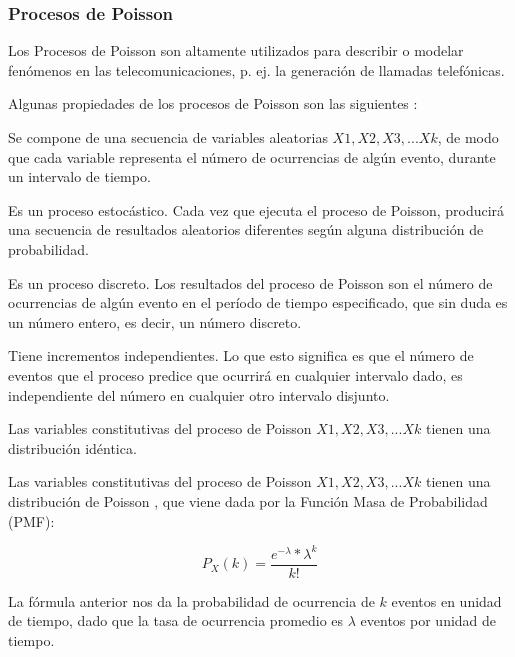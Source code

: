 \subsubsection{Procesos de Poisson}

Los Procesos de Poisson son altamente utilizados para describir o modelar fenómenos en las telecomunicaciones, p. ej. la generación de llamadas telefónicas.\newline

Algunas propiedades de los procesos de Poisson son las siguientes \parencite{ PoissonMedium}:

Se compone de una secuencia de variables aleatorias $X1, X2, X3, ... Xk$, de modo que cada variable representa el número de ocurrencias de algún evento, durante un intervalo de tiempo.\newline

Es un proceso estocástico. Cada vez que ejecuta el proceso de Poisson, producirá una secuencia de resultados aleatorios diferentes según alguna distribución de probabilidad.\newline

Es un proceso discreto. Los resultados del proceso de Poisson son el número de ocurrencias de algún evento en el período de tiempo especificado, que sin duda es un número entero, es decir, un número discreto.\newline

Tiene incrementos independientes. Lo que esto significa es que el número de eventos que el proceso predice que ocurrirá en cualquier intervalo dado, es independiente del número en cualquier otro intervalo disjunto. \newline

Las variables constitutivas del proceso de Poisson $X1, X2, X3, ... Xk$ tienen una distribución idéntica.\newline

Las variables constitutivas del proceso de Poisson $X1, X2, X3, ... Xk$ tienen una distribución de Poisson , que viene dada por la Función Masa de Probabilidad (PMF):

\begin{equation}
    P_{X}(k)=\frac{e^{-\lambda}*\lambda ^{k}}{k!}
    \label{eqn:Poisson}
\end{equation}

La fórmula anterior nos da la probabilidad de ocurrencia de $k$ eventos en unidad de tiempo, dado que la tasa de ocurrencia promedio es $\lambda$ eventos por unidad de tiempo.\newline


